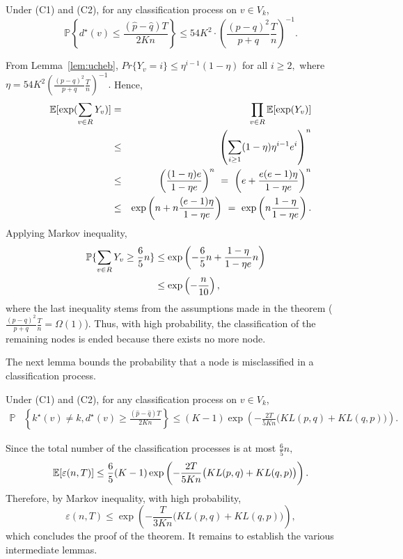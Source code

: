 \begin{lemma}Under (C1) and (C2), for any classification process on $v \in {V}_k$,
$$\mathbb{P} \left\{ d^{\star}(v)  \le \frac{( \hat{p}-\hat{q})T}{2Kn}  \right\} \le 54K^2 \cdot (\frac{(p-q)^2}{p+q}\frac{T}{n})^{-1} .$$
\label{lem:ucheb}
\end{lemma}
From Lemma~\ref{lem:ucheb}, $Pr\{Y_v = i \} \le \eta^{i-1}
(1-\eta)$ for all $i \ge 2,$ where $\eta = 54K^2
(\frac{(p-q)^2}{p+q}\frac{T}{n})^{-1}.$ Hence, 
\begin{eqnarray*}
{\mathbb E} [ \exp (\sum_{v\in R}Y_v)] &=& \prod_{v\in R} {\mathbb E} [ \exp (Y_v)] \cr
 & \le & \left( \sum_{i \ge 1} (1-\eta) \eta^{i-1} e^i \right)^n\cr
 & \le &\left( \frac{(1-\eta) e}{1-\eta e} \right)^n ~=~\left(e+\frac{e(e-1)\eta}{1-   \eta e} \right)^n\cr
&\le&\exp\left(n+n\frac{(e-1)\eta }{1- \eta e} \right) ~ = ~ \exp\left( n\frac{1-\eta}{1- \eta e} \right).
\end{eqnarray*}
Applying Markov inequality,
\begin{align*}
\mathbb{P}\{\sum_{v\in R}Y_v \ge \frac{6}{5}n \} &\le \exp
\left(-\frac{6}{5}n +\frac{ 1-\eta}{1- \eta e}n \right) \cr 
& \le
\exp\left(-\frac{n}{10} \right),
\end{align*}
where the last inequality stems from the assumptions made in the theorem  ($\frac{(p-q)^2}{p+q}\frac{T}{n}= \Omega (1)$). Thus, with high probability, the classification of the remaining nodes is ended because there exists no more node.

The next lemma bounds the probability that a node is misclassified in a classification process.

\begin{lemma}Under (C1) and (C2), for any classification process on $v \in {V}_k$,
\begin{align*}\mathbb{P}& \left\{ k^{\star}(v) \neq k, d^{\star}(v)  \ge \frac{(\hat{p}-\hat{q})T}{2Kn}   \right\}  \le (K-1)\exp\left(-\frac{2T}{5Kn} \big( KL(p,q)
  + KL(q , p) \big) \right).\end{align*}\label{lem:upart}
\end{lemma}
Since the total number of the classification processes is at most $\frac{6}{5}n,$
$${\mathbb E} [ \varepsilon(n,T)] \le  \frac{6}{5}(K-1)\exp\left(-\frac{2T}{5Kn} \big( KL(p,q)
  + KL(q, p) \big) \right).$$
Therefore, by Markov inequality, with high probability, 
$$ \varepsilon(n,T) \le  \exp\left(-\frac{T}{3Kn} \big( KL(p,q)
  + KL(q, p) \big) \right),$$
which concludes the proof of the theorem. It remains to establish the various intermediate lemmas.

